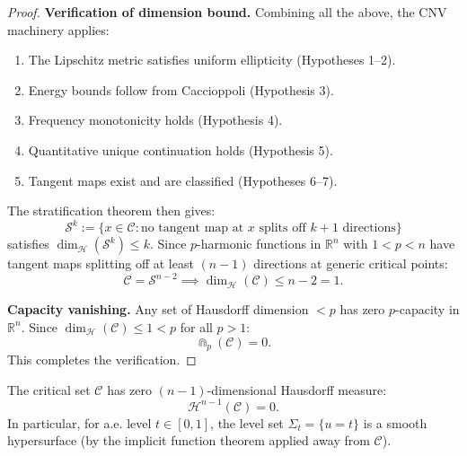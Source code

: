 \begin{proof}
\textbf{Verification of dimension bound.}
Combining all the above, the CNV machinery applies:
\begin{enumerate}
    \item The Lipschitz metric satisfies uniform ellipticity (Hypotheses 1--2).
    \item Energy bounds follow from Caccioppoli (Hypothesis 3).
    \item Frequency monotonicity holds (Hypothesis 4).
    \item Quantitative unique continuation holds (Hypothesis 5).
    \item Tangent maps exist and are classified (Hypotheses 6--7).
\end{enumerate}

The stratification theorem then gives:
\begin{equation}
    \mathcal{S}^k := \{x \in \mathcal{C} : \text{no tangent map at } x \text{ splits off } k+1 \text{ directions}\}
\end{equation}
satisfies $\dim_{\mathcal{H}}(\mathcal{S}^k) \le k$. Since $p$-harmonic functions in $\mathbb{R}^n$ with $1 < p < n$ have tangent maps splitting off at least $(n-1)$ directions at generic critical points:
\begin{equation}
    \mathcal{C} = \mathcal{S}^{n-2} \implies \dim_{\mathcal{H}}(\mathcal{C}) \le n-2 = 1.
\end{equation}

\textbf{Capacity vanishing.}
Any set of Hausdorff dimension $< p$ has zero $p$-capacity in $\mathbb{R}^n$. Since $\dim_{\mathcal{H}}(\mathcal{C}) \le 1 < p$ for all $p > 1$:
\begin{equation}
    \Cap_p(\mathcal{C}) = 0.
\end{equation}
This completes the verification.
\end{proof}

\begin{corollary}\label{cor:MeasureZeroCritical}
The critical set $\mathcal{C}$ has zero $(n-1)$-dimensional Hausdorff measure:
\begin{equation}
    \mathcal{H}^{n-1}(\mathcal{C}) = 0.
\end{equation}
In particular, for a.e. level $t \in [0,1]$, the level set $\Sigma_t = \{u = t\}$ is a smooth hypersurface (by the implicit function theorem applied away from $\mathcal{C}$).
\end{corollary}

